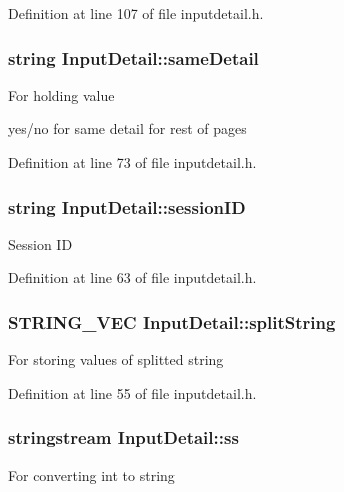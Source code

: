 Definition at line 107 of file inputdetail.\-h.

\hypertarget{classInputDetail_a13313d76b2ccc308634a7d802a46936a}{
\subsubsection[{same\-Detail}]{\setlength{\rightskip}{0pt plus 5cm}string Input\-Detail\-::same\-Detail\hspace{0.3cm}{\ttfamily [protected]}}}\label{classInputDetail_a13313d76b2ccc308634a7d802a46936a}
\begin{DoxyVerb} For holding value
\end{DoxyVerb}
 yes/no for same detail for rest of pages 

Definition at line 73 of file inputdetail.\-h.

\hypertarget{classInputDetail_a1f276e4df260009d465032ec64f3a543}{
\subsubsection[{session\-I\-D}]{\setlength{\rightskip}{0pt plus 5cm}string Input\-Detail\-::session\-I\-D\hspace{0.3cm}{\ttfamily [protected]}}}\label{classInputDetail_a1f276e4df260009d465032ec64f3a543}
Session I\-D 

Definition at line 63 of file inputdetail.\-h.

\hypertarget{classInputDetail_ab09ed4176090a72237531cedf00afb41}{
\subsubsection[{split\-String}]{\setlength{\rightskip}{0pt plus 5cm}S\-T\-R\-I\-N\-G\-\_\-\-V\-E\-C Input\-Detail\-::split\-String\hspace{0.3cm}{\ttfamily [protected]}}}\label{classInputDetail_ab09ed4176090a72237531cedf00afb41}
For storing values of splitted string 

Definition at line 55 of file inputdetail.\-h.

\hypertarget{classInputDetail_a5284736b5fd3db0251cfeab7c581c0bd}{
\subsubsection[{ss}]{\setlength{\rightskip}{0pt plus 5cm}stringstream Input\-Detail\-::ss\hspace{0.3cm}{\ttfamily [protected]}}}\label{classInputDetail_a5284736b5fd3db0251cfeab7c581c0bd}
For converting int to string 

